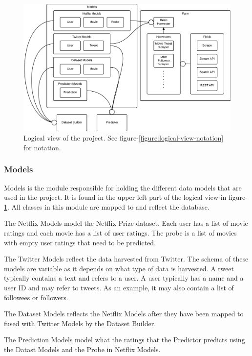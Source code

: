 \begin{center}
\begin{figure}[H]
\centerline{\includegraphics[width=7in]{image/architecture-logical-view.png}}
\caption[Logical view]{Logical view of the project. See figure-\ref{figure:logical-view-notation} for notation.}
\label{figure:logical-view}
\end{figure}
\end{center}

\subsubsection{Models}
Models is the module responsible for holding the different data models that are used in the project. It is found in the upper left part of the logical view in figure-\ref{figure:logical-view}. All classes in this module are mapped to and reflect the database.

The Netflix Models model the Netflix Prize dataset. Each user has a list of movie ratings and each movie has a list of user ratings. The probe is a list of movies with empty user ratings that need to be predicted.

The Twitter Models reflect the data harvested from Twitter. The schema of these models are variable as it depends on what type of data is harvested. A tweet typically contains a text and refers to a user. A user typically has a name and a user ID and may refer to tweets. As an example, it may also contain a list of followees or followers.

The Dataset Models reflects the Netflix Models after they have been mapped to fused with Twitter Models by the Dataset Builder.

The Prediction Models model what the ratings that the Predictor predicts using the Datast Models and the Probe in Netflix Models.

